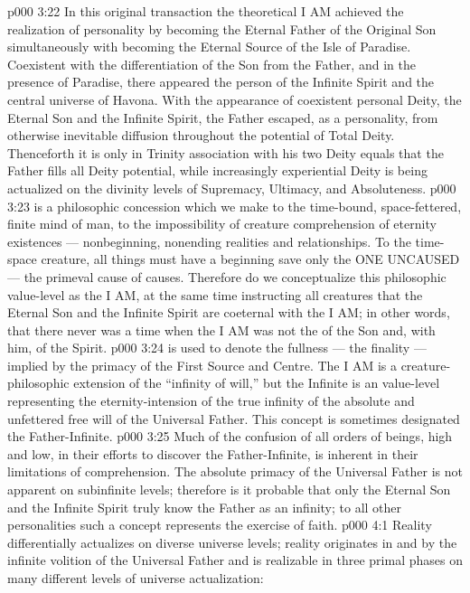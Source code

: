 \vs p000 3:22 In this original transaction the theoretical I AM achieved the realization of personality by becoming the Eternal Father of the Original Son simultaneously with becoming the Eternal Source of the Isle of Paradise. Coexistent with the differentiation of the Son from the Father, and in the presence of Paradise, there appeared the person of the Infinite Spirit and the central universe of Havona. With the appearance of coexistent personal Deity, the Eternal Son and the Infinite Spirit, the Father escaped, as a personality, from otherwise inevitable diffusion throughout the potential of Total Deity. Thenceforth it is only in Trinity association with his two Deity equals that the Father fills all Deity potential, while increasingly experiential Deity is being actualized on the divinity levels of Supremacy, Ultimacy, and Absoluteness.
\vs p000 3:23 \pc {} is a philosophic concession which we make to the time\hyp{}bound, space\hyp{}fettered, finite mind of man, to the impossibility of creature comprehension of eternity existences --- nonbeginning, nonending realities and relationships. To the time\hyp{}space creature, all things must have a beginning save only the ONE UNCAUSED --- the primeval cause of causes. Therefore do we conceptualize this philosophic value\hyp{}level as the I AM, at the same time instructing all creatures that the Eternal Son and the Infinite Spirit are coeternal with the I AM; in other words, that there never was a time when the I AM was not the  of the Son and, with him, of the Spirit.
\vs p000 3:24 \pc {} is used to denote the fullness --- the finality --- implied by the primacy of the First Source and Centre. The  I AM is a creature\hyp{}philosophic extension of the “infinity of will,” but the Infinite is an  value\hyp{}level representing the eternity\hyp{}intension of the true infinity of the absolute and unfettered free will of the Universal Father. This concept is sometimes designated the Father\hyp{}Infinite.
\vs p000 3:25 Much of the confusion of all orders of beings, high and low, in their efforts to discover the Father\hyp{}Infinite, is inherent in their limitations of comprehension. The absolute primacy of the Universal Father is not apparent on subinfinite levels; therefore is it probable that only the Eternal Son and the Infinite Spirit truly know the Father as an infinity; to all other personalities such a concept represents the exercise of faith.
\vs p000 4:1 Reality differentially actualizes on diverse universe levels; reality originates in and by the infinite volition of the Universal Father and is realizable in three primal phases on many different levels of universe actualization:
